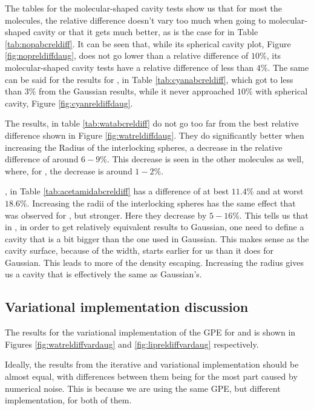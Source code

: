 \documentclass[../master_thesis.tex]{subfiles}
\begin{document}
The tables for the molecular-shaped cavity tests  show us that for most the molecules, the
relative difference doesn't vary too much when going to molecular-shaped cavity or that it gets
much better, as is the case for  in Table \ref{tab:nopabcreldiff}.
It can be seen that, while its spherical cavity plot, Figure \ref{fig:nopreldiffdaug}, does not go
lower than a relative difference of $10\%$, its molecular-shaped cavity tests have a relative difference
of less than $4\%$. The same can be said for the results for , in Table \ref{tab:cyanabcreldiff},
which got to less than $3\%$ from the Gaussian results, while it never approached $10\%$
with spherical cavity, Figure \ref{fig:cyanreldiffdaug}.

The  results, in table \ref{tab:watabcreldiff} do not go too far from the best relative difference
shown in Figure \ref{fig:watreldiffdaug}. They do significantly better when increasing
the Radius of the interlocking spheres, a decrease in the relative difference of
around $6-9\%$. This decrease is seen in the other molecules as well, where,
for , the decrease is around $1-2\%$.

, in Table \ref{tab:acetamidabcreldiff} has a difference of at
best $11.4\%$ and at worst $18.6\%$. Increasing the radii of the interlocking spheres
has the same effect that was observed for , but stronger. Here they decrease by
$ 5-16\%$.  This tells us that in \mrchem, in order to get relatively equivalent results to
Gaussian, one need to define a cavity that is a bit bigger than the one used in Gaussian.
This makes sense as the cavity surface, because of the width, starts earlier for us
than it does for Gaussian. This leads to more of the density escaping. Increasing the
radius gives us a cavity that is effectively the same as Gaussian's.

\subsection{Variational implementation discussion}
The results for the variational implementation of the \ac{GPE} for  and 
is shown in Figures \ref{fig:watreldiffvardaug} and \ref{fig:lipreldiffvardaug}
respectively.

Ideally, the results from the iterative and variational implementation should be
almost equal, with differences between them being for the most part caused by numerical
noise. This is because we are using the same \ac{GPE}, but different implementation,
for both of them.
\end{document}
